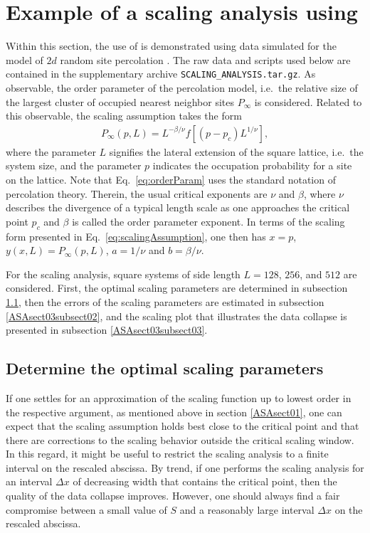 \section{Example of a scaling analysis using \myProg{}}
\label{ASAsect03}
Within this section, the use of \myProg{} is demonstrated using data simulated for the model 
of $2d$ random site percolation \cite{ASAstauffer1979}.
The raw data and scripts used below are contained in the supplementary
archive \verb'SCALING_ANALYSIS.tar.gz'.
As observable, the order parameter of the percolation model, i.e.\ the relative size of
the largest cluster of occupied nearest neighbor sites
$P_\infty$ %
is considered.
Related to this observable, the scaling assumption takes the form 
\begin{eqnarray}
P_\infty(p,L)=L^{-\beta/\nu} f[(p\!-\!p_c)L^{1/\nu}], \label{eq:orderParam}
\end{eqnarray} 
where the parameter $L$ signifies the lateral extension of the square lattice, i.e.\ the system size, 
and the parameter $p$ indicates the occupation probability for a site on the lattice. 
Note that Eq.\ \ref{eq:orderParam} uses the standard notation of percolation theory.
Therein, the usual critical exponents are $\nu$ and $\beta$, where 
$\nu$ describes the divergence of a typical length scale as one approaches the 
critical point $p_c$ and $\beta$ is called the order parameter exponent.
In terms of the scaling form presented in Eq.\ \ref{eq:scalingAssumption}, one then has
$x=p$, $y(x,L)=P_\infty(p,L)$, $a=1/\nu$ and $b=\beta/\nu$.

For the scaling analysis, square systems of side length $L=128$, $256$, and $512$ are considered.
First, the optimal scaling parameters are determined in subsection \ref{ASAsect03subsect01}, 
then the errors of the scaling parameters are estimated in subsection \ref{ASAsect03subsect02}, and
the scaling plot that illustrates the data collapse is presented in subsection \ref{ASAsect03subsect03}. 

\subsection{Determine the optimal scaling parameters}
\label{ASAsect03subsect01}
If one settles for an approximation of the scaling function up to lowest order in 
the respective argument, as mentioned above in section \ref{ASAsect01}, one can expect that the scaling assumption 
holds best close to the critical point and that there are corrections to the scaling 
behavior outside the critical scaling window. In this regard, it might be useful to 
restrict the scaling analysis to a finite interval on the rescaled abscissa.
By trend, if one performs the scaling analysis for an interval 
$\Delta x$ of decreasing width that contains the critical point, 
then the quality of the data collapse improves. However, one should always find
a fair compromise between a small value of $S$ and a reasonably large interval 
$\Delta x$ on the rescaled abscissa.


